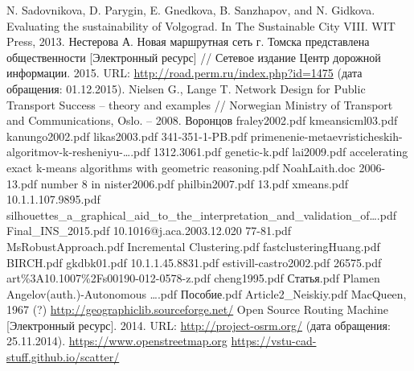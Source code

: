 \renewcommand{\bibname}{%
    \vspace{-1em}\begin{center}
        Список используемой литературы
    \end{center}\vspace{-2em}
}

\pagestyle{empty}

\begin{thebibliography}{99}
     N. Sadovnikova, D. Parygin, E. Gnedkova, B. Sanzhapov, and N. Gidkova. 
        Evaluating the sustainability of Volgograd. In The Sustainable City VIII. WIT Press, 2013.
     Нестерова А. Новая маршрутная сеть г. Томска представлена общественности 
        [Электронный ресурс] // Сетевое издание Центр дорожной информации. 2015. URL: 
        \url{http://road.perm.ru/index.php?id=1475} (дата обращения: 01.12.2015).
     Nielsen G., Lange T. Network Design for Public Transport Success -- theory and 
        examples // Norwegian Ministry of Transport and Communications, Oslo. -- 2008.
     Воронцов
     fraley2002.pdf
     kmeansicml03.pdf
     kanungo2002.pdf
     likas2003.pdf
     341-351-1-PB.pdf
     primenenie-metaevristicheskih-algoritmov-k-resheniyu-\ldots.pdf
     1312.3061.pdf
     genetic-k.pdf
     lai2009.pdf
     accelerating exact k-means algorithms with geometric reasoning.pdf
     NoahLaith.doc
     2006-13.pdf
     number 8 in \cite{lenka}
     nister2006.pdf
     philbin2007.pdf
     13.pdf
     xmeans.pdf
     10.1.1.107.9895.pdf
     silhouettes\_a\_graphical\_aid\_to\_the\_interpretation\_and\_validation\_of\ldots.pdf
     Final\_INS\_2015.pdf
     10.1016@j.aca.2003.12.020
     77-81.pdf
     MsRobustApproach.pdf
     Incremental Clustering.pdf
     fastclusteringHuang.pdf
     BIRCH.pdf
     gkdbk01.pdf
     10.1.1.45.8831.pdf
     estivill-castro2002.pdf
     26575.pdf
     art\%3A10.1007\%2Fs00190-012-0578-z.pdf
     cheng1995.pdf
     Статья.pdf
     Plamen Angelov(auth.)-Autonomous \ldots.pdf
     Пособие.pdf
     Article2\_Neiskiy.pdf
     MacQueen, 1967 (?)
     \url{http://geographiclib.sourceforge.net/}
     Open Source Routing Machine [Электронный ресурс]. 2014. URL: \url{http://project-osrm.org/} (дата обращения: 25.11.2014).
     \url{https://www.openstreetmap.org}
     \url{https://vstu-cad-stuff.github.io/scatter/}
        

\end{thebibliography}
